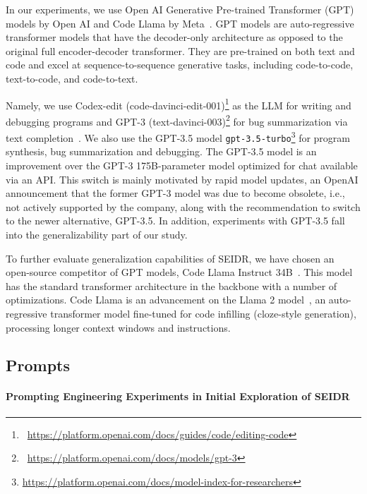 In our experiments, we use Open AI Generative Pre-trained Transformer (GPT) models by Open AI and Code Llama by Meta~\cite{roziere2023:code}. 
GPT models are auto-regressive transformer models that have the decoder-only architecture as opposed to the original full encoder-decoder transformer.
They are pre-trained on both text and code and excel at sequence-to-sequence generative tasks, including code-to-code, text-to-code, and code-to-text.

Namely, we use Codex-edit (code-davinci-edit-001)\footnote{~\url{https://platform.openai.com/docs/guides/code/editing-code}} as the LLM for writing and debugging programs and GPT-3 (text-davinci-003)\footnote{~\url{https://platform.openai.com/docs/models/gpt-3}} for bug summarization via text completion~\cite{brown2020:language}.
We also use the GPT-3.5 model \texttt{gpt-3.5-turbo}\footnote{\url{https://platform.openai.com/docs/model-index-for-researchers}} for program synthesis, bug summarization and debugging. 
The GPT-3.5 model is an improvement over the GPT-3 175B-parameter model optimized for chat available via an API.
This switch is mainly motivated by rapid model updates, an OpenAI announcement that the former GPT-3 model was due to become obsolete, i.e., not actively supported by the company, along with the recommendation to switch to the newer alternative, GPT-3.5. 
In addition, experiments with GPT-3.5 fall into the generalizability part of our study.

To further evaluate generalization capabilities of SEIDR, we have chosen an open-source competitor of GPT models, Code Llama Instruct 34B~\cite{roziere2023:code}. 
This model has the standard transformer architecture in the backbone with a number of optimizations.
Code Llama is an advancement on the Llama 2 model~\cite{touvron2023:llama}, an auto-regressive transformer model fine-tuned for code infilling (cloze-style generation), processing longer context windows and instructions.

\newpage \subsection{Prompts}
\label{sec:seidr-prompts}


\paragraph{Prompting Engineering Experiments in Initial Exploration of SEIDR}
\label{sec:seidr-prompt-strategies}

